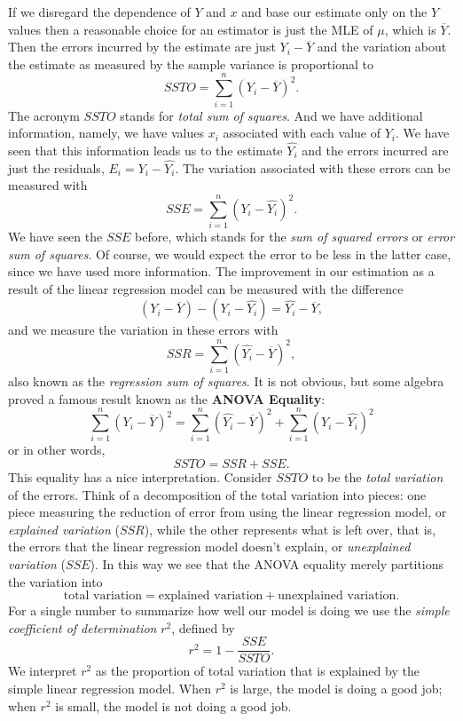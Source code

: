 \documentclass[captions=tableheading]{scrbook}
\begin{document}
If we disregard the dependence of \(Y\) and \(x\) and base our estimate only on the \(Y\) values then a reasonable choice for an estimator is just the MLE of \(\mu\), which is \(\overline{Y}\). Then the errors incurred by the estimate are just \(Y_{i}-\overline{Y}\) and the variation about the estimate as measured by the sample variance is proportional to
\begin{equation}
SSTO=\sum_{i=1}^{n}(Y_{i}-\overline{Y})^{2}.
\end{equation}
The acronym \(SSTO\) stands for \emph{total sum of squares}.  And we have additional information, namely, we have values \(x_{i}\) associated with each value of \(Y_{i}\). We have seen that this information leads us to the estimate \(\hat{Y_{i}}\) and the errors incurred are just the residuals, \(E_{i}=Y_{i}-\hat{Y_{i}}\). The variation associated with these errors can be measured with 
\begin{equation}
SSE=\sum_{i=1}^{n}(Y_{i}-\hat{Y_{i}})^{2}.
\end{equation}
We have seen the \(SSE\) before, which stands for the \emph{sum of squared errors} or \emph{error sum of squares}. Of course, we would expect the error to be less in the latter case, since we have used more information. The improvement in our estimation as a result of the linear regression model can be measured with the difference
\[
(Y_{i}-\overline{Y})-(Y_{i}-\hat{Y_{i}})=\hat{Y_{i}}-\overline{Y},
\]
and we measure the variation in these errors with
\begin{equation}
SSR=\sum_{i=1}^{n}(\hat{Y_{i}}-\overline{Y})^{2},
\end{equation}
also known as the \emph{regression sum of squares}. It is not obvious, but some algebra proved a famous result known as the \textbf{ANOVA Equality}:
\begin{equation}
\sum_{i=1}^{n}(Y_{i}-\overline{Y})^{2}=\sum_{i=1}^{n}(\hat{Y_{i}}-\overline{Y})^{2}+\sum_{i=1}^{n}(Y_{i}-\hat{Y_{i}})^{2}\label{eq-anovaeq}
\end{equation}
or in other words,
\begin{equation}
SSTO=SSR+SSE.
\end{equation}
This equality has a nice interpretation. Consider \(SSTO\) to be the \emph{total variation} of the errors. Think of a decomposition of the total variation into pieces: one piece measuring the reduction of error from using the linear regression model, or \emph{explained variation} (\(SSR\)), while the other represents what is left over, that is, the errors that the linear regression model doesn't explain, or \emph{unexplained variation} (\(SSE\)). In this way we see that the ANOVA equality merely partitions the variation into 
\[
\mbox{total variation}=\mbox{explained variation}+\mbox{unexplained variation}.
\]
For a single number to summarize how well our model is doing we use the \emph{simple coefficient of determination} \(r^{2}\), defined by
\begin{equation}
r^{2}=1-\frac{SSE}{SSTO}.
\end{equation}
We interpret \(r^{2}\) as the proportion of total variation that is explained by the simple linear regression model. When \(r^{2}\) is large, the model is doing a good job; when \(r^{2}\) is small, the model is not doing a good job.
\end{document}
